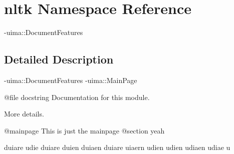 \hypertarget{namespacenltk}{\section{nltk \-Namespace \-Reference}
\label{namespacenltk}
}


-\/uima\-::\-Document\-Features  




\subsection{\-Detailed \-Description}
-\/uima\-::\-Document\-Features -\/uima\-::\-Main\-Page

\begin{DoxyVerb}@file docstring
Documentation for this module.

More details.
\end{DoxyVerb}


\begin{DoxyVerb}@mainpage This is just the mainpage
@section yeah

duiare udie duiare duien duiaen duiare 
uiaern udien udien udiaen udiae u

\end{DoxyVerb}
 